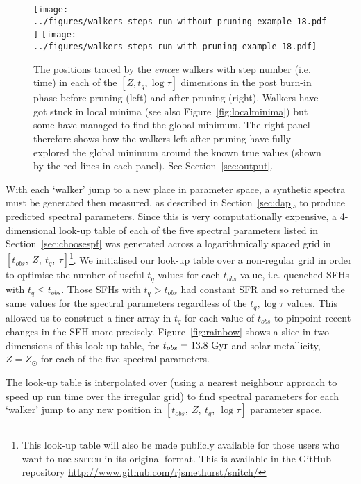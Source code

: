 \documentclass[useAMS,usenatbib]{mn2e}
\begin{document}
\begin{figure*}
\centering
\texttt{[image: ../figures/walkers\_steps\_run\_without\_pruning\_example\_18.pdf]}
\texttt{[image: ../figures/walkers\_steps\_run\_with\_pruning\_example\_18.pdf]}
\caption{The positions traced by the \emph{emcee} walkers with step number (i.e. time) in each of the $[Z, t_q, \log \tau]$ dimensions in the post burn-in phase before pruning (left) and after pruning (right). Walkers have got stuck in local minima (see also Figure~\ref{fig:localminima}) but some have managed to find the global minimum. The right panel therefore shows how the walkers left after pruning have fully explored the global minimum around the known true values (shown by the red lines in each panel). See Section~\ref{sec:output}.}
\label{fig:comparepruning}
\end{figure*}

With each `walker' jump to a new place in parameter space, a synthetic spectra must be generated then measured, as described in Section~\ref{sec:dap}, to produce predicted spectral parameters. Since this is very computationally expensive, a 4-dimensional look-up table of each of the five spectral parameters listed in Section~\ref{sec:choosespf} was generated across a logarithmically spaced grid in $[t_{obs},~Z,~t_q,~\tau]$\footnote{This look-up table will also be made publicly available for those users who want to use \textsc{snitch} in its original format. This is available in the GitHub repository \url{http://www.github.com/rjsmethurst/snitch/}}. We initialised our look-up table over a non-regular grid in order to optimise the number of useful $t_q$ values for each $t_{obs}$ value, i.e. quenched SFHs with $t_q \leq t_{obs}$. Those SFHs with $t_q > t_{obs}$ had constant SFR and so returned the same values for the spectral parameters regardless of the $t_q, \log\tau$ values. This allowed us to construct a finer array in $t_q$ for each value of $t_{obs}$ to pinpoint recent changes in the SFH more precisely. Figure~\ref{fig:rainbow} shows a slice in two dimensions of this look-up table, for $t_{obs} = 13.8~\rm{Gyr}$ and solar metallicity, $Z=Z_{\odot}$ for each of the five spectral parameters.

 
The look-up table is interpolated over (using a nearest neighbour approach to speed up run time over the irregular grid) to find spectral parameters for each `walker' jump to any new position in $[t_{obs},~Z,~t_q,~\log\tau]$ parameter space. 
\end{document}
